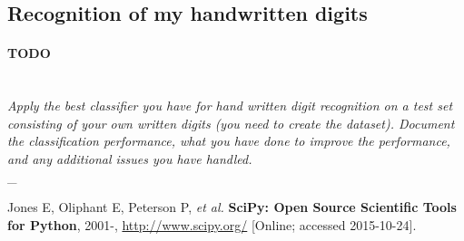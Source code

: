 \documentclass{article}
\numberwithin{figure}{section}
\newcommand{\outline}[2]{\paragraph{\textsc{#1}}\hrulefill~\\{\small\it #2}\\\_\hrulefill}
\newcommand{\todo}[1]{\outline{\large TODO}{#1}}
\begin{document}
\subsection{Recognition of my handwritten digits}
\todo{Apply the best classifier you have for hand written digit recognition on a test set consisting of your own written digits (you need to create the dataset). Document the classification performance, what you have done to improve the performance, and any additional issues you have handled.}


\begin{thebibliography}{9}

    Jones E, Oliphant E, Peterson P, \emph{et al.}
    {\bf SciPy: Open Source Scientific Tools for Python}, 2001-,
    \url{http://www.scipy.org/} [Online; accessed 2015-10-24].

\end{thebibliography}

\end{document}
